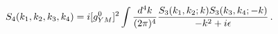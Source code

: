 \begin{equation}
  S_4(k_1,k_2,k_3,k_4)=i [g_{YM}^0]^2\int {{d^4 k}\over {(2\pi)^4}}{{S_3(k_1,k_2;k)S_3(k_3,k_4;-k)}\over
  {-k^2+i\epsilon}}\, \label{unit}.
  \end{equation}

